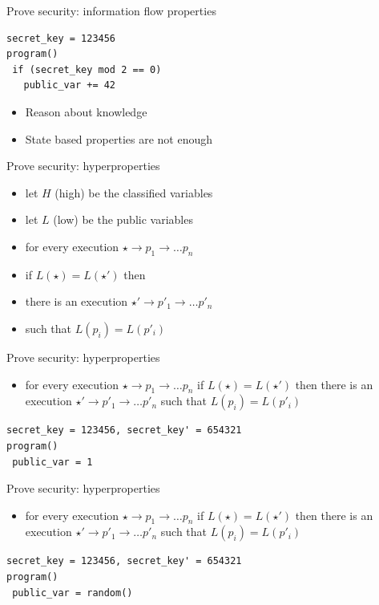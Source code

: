 \documentclass{beamer}
\begin{document}
\begin{frame}[fragile]{Prove security: information flow properties}
  \begin{verbatim}
secret_key = 123456
program()
 if (secret_key mod 2 == 0)
   public_var += 42
  \end{verbatim}
  \begin{itemize}
  \item Reason about knowledge
  \item<2-> State based properties are not enough
  \end{itemize}
\end{frame}

\begin{frame}{Prove security: hyperproperties}
  \begin{itemize}
  \item let $H$ (high) be the classified variables
  \item let $L$ (low) be the public variables
  \item for every execution $\star \rightarrow p_1 \rightarrow \dots p_n$
  \item if $L(\star) = L(\star')$ then
  \item there is an execution  $\star' \rightarrow p'_1 \rightarrow \dots p'_n$
  \item such that $L(p_i) = L(p'_i)$
  \end{itemize}
\end{frame}

\begin{frame}[fragile]{Prove security: hyperproperties}
  \begin{itemize}
  \item for every execution $\star \rightarrow p_1 \rightarrow \dots p_n$
    if $L(\star) = L(\star')$  then there is an execution
    $\star' \rightarrow p'_1 \rightarrow \dots p'_n$
  such that $L(p_i) = L(p'_i)$
  \end{itemize}
  \begin{verbatim}
secret_key = 123456, secret_key' = 654321
program()
 public_var = 1
  \end{verbatim}
\end{frame}

\begin{frame}[fragile]{Prove security: hyperproperties}
  \begin{itemize}
  \item for every execution $\star \rightarrow p_1 \rightarrow \dots p_n$
    if $L(\star) = L(\star')$  then there is an execution
    $\star' \rightarrow p'_1 \rightarrow \dots p'_n$
  such that $L(p_i) = L(p'_i)$
  \end{itemize}
  \begin{verbatim}
secret_key = 123456, secret_key' = 654321
program()
 public_var = random()
  \end{verbatim}
\end{frame}
\end{document}
